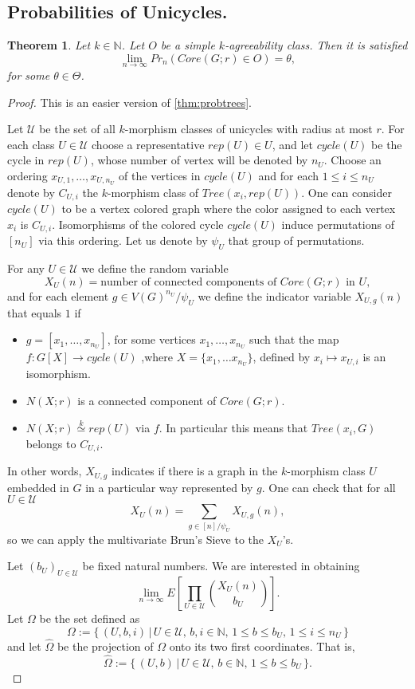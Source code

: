 \documentclass[11pt,notitlepage]{report}
\newtheorem{theorem}{Theorem}[chapter]
\theoremstyle{definition}
\newcommand{\N}{\mathbb{N}}
\newcommand{\Ln}{\lim\limits_{n\to \infty}}
\newcommand{\morph}[1]{\stackrel{#1}{\simeq}}
\begin{document}
\subsection{Probabilities of Unicycles.}

\begin{theorem} \label{thm:probcycles}
	Let $k\in \N$.
	Let $O$ be a simple $k$-agreeability class. Then it is satisfied
	\[ \Ln Pr_n(Core(G;r)\in O) = \theta, \]
	for some $\theta\in \Theta$.
\end{theorem}

\begin{proof}
	This is an easier version of \cref{thm:probtrees}.\par
	Let $\mathcal{U}$ be the set of all $k$-morphism classes of 
	unicycles with radius at most $r$. 
	For each class $U\in \mathcal{U}$ choose a representative $rep(U)\in U$, 
	and let  $cycle(U)$ be the cycle in $rep(U)$, whose number of vertex will be
	denoted by $n_U$. Choose an ordering $x_{U,1},\dots, x_{U,n_U}$
	of the vertices in $cycle(U)$ and for each $1\leq i \leq n_{U}$ 
	denote by $C_{U,i}$ the $k$-morphism class
	of $Tree(x_i,rep(U))$. One can consider $cycle(U)$ to be a 
	vertex colored graph where the color assigned to each vertex $x_i$
    is $C_{U,i}$. Isomorphisms of the colored cycle 
	$cycle(U)$ induce permutations of $[n_U]$ via this ordering. 
	Let us denote by $\psi_U$ that group of permutations.\par 
	For any $U\in \mathcal{U}$ we define the random variable 
	\[X_{U}(n)=\text{number of connected components of }Core(G;r) 
	\text{ in } U ,\]
	and for each element $g\in V(G)^{n_U}/\psi_U$ 
	we define the indicator variable $X_{U,g}(n)$ that equals $1$ if 
	\begin{itemize}
		\item $g=[x_1,\dots, x_{n_U}]$, for some vertices
		$x_1,\dots, x_{n_U}$ such that the map $f:G[X]\rightarrow cycle(U)$ 
		,where $X=\{x_1,\dots x_{n_U}\}$, defined by $x_i\mapsto x_{U,i}$ is an
		isomorphism. 
		\item $N(X;r)$ is a connected component of $Core(G;r)$.
		\item $N(X;r)\morph{k} rep(U)$ via $f$. In particular this means
		that $Tree(x_i, G)$ belongs to $C_{U,i}$.
	\end{itemize}	
	In other words, $X_{U,g}$ indicates if there is a graph in the $k$-morphism
	class $U$ embedded in $G$ in a particular way represented by $g$.
	One can check that for all $U\in \mathcal{U}$
	\[ X_U(n)=\sum_{g\in [n]/\psi_U} X_{U,g}(n),  \]
	so we can apply the multivariate Brun's Sieve to the $X_U$'s.\par
	Let $(b_U)_{U\in \mathcal{U}}$ be fixed natural numbers. We are interested
	in obtaining
	\[\Ln E\left[\prod_{U\in \mathcal{U}}
	\binom{X_{U}(n)}{b_{U}}\right].\]
	Let $\Omega$ be the set defined as
	\[ \Omega:= \{\, (U,b,i) \, | \, U\in \mathcal{U}, 
	\, b,i\in \N, \, 1\leq b \leq b_U,  \, 1\leq i \leq n_U\,  \}\]
	and let $\widehat{\Omega}$ be the projection of $\Omega$ onto its
	two first coordinates. That is, 
	\[\widehat{\Omega}:=\{\, (U,b) \, | \, U\in \mathcal{U}, 
	\, b\in \N, \, 1\leq b \leq b_U \, \}. \] 


\end{proof}
\end{document}
